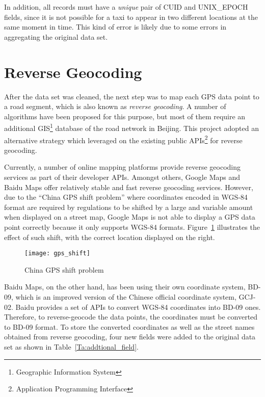 In addition, all records must have a \emph{unique} pair of CUID and UNIX\_EPOCH fields, since it is not possible for a taxi to appear in two different locations at the same moment in time. This kind of error is likely due to some errors in aggregating the original data set.

\section{Reverse Geocoding}
After the data set was cleaned, the next step was to map each GPS data point to a road segment, which is also known as \emph{reverse geocoding}. A number of algorithms\cite{MAP09} have been proposed for this purpose, but most of them require an additional GIS\footnote{Geographic Information System} database of the road network in Beijing. This project adopted an alternative strategy which leveraged on the existing public APIs\footnote{Application Programming Interface} for reverse geocoding. 

Currently, a number of online mapping platforms provide reverse geocoding services as part of their developer APIs. Amongst others, Google Maps and Baidu Maps offer relatively stable and fast reverse geocoding services. However, due to the ``China GPS shift problem''\cite{GSHF17} where coordinates encoded in WGS-84 format are required by regulations to be shifted by a large and variable amount when displayed on a street map, Google Maps is not able to display a GPS data point correctly because it only supports WGS-84 formats. Figure~\ref{Fig:gps_shift} illustrates the effect of such shift, with the correct location displayed on the right. 

\begin{figure}[h]
\texttt{[image: gps\_shift]}
\centering
\caption{China GPS shift problem}\label{Fig:gps_shift}
\end{figure}

Baidu Maps, on the other hand, has been using their own coordinate system, BD-09, which is an improved version of the Chinese official coordinate system, GCJ-02. Baidu provides a set of APIs to convert WGS-84 coordinates into BD-09 ones. Therefore, to reverse-geocode the data points, the coordinates must be converted to BD-09 format. To store the converted coordinates as well as the street names obtained from reverse geocoding, four new fields were added to the original data set as shown in Table~\ref{Ta:addtional_field}.

